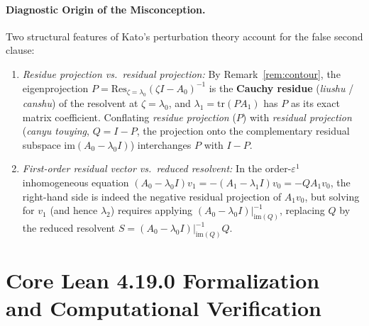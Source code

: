 \documentclass[11pt,a4paper]{article}
\theoremstyle{definition}
\newcommand{\tr}{\mathrm{tr}}
\newcommand{\im}{\mathrm{im}}
\newcommand{\Res}{\mathrm{Res}}
\begin{document}
\paragraph{Diagnostic Origin of the Misconception.}
Two structural features of Kato's perturbation theory account for the false second
clause:
\begin{enumerate}
  \item \emph{Residue projection vs.\ residual projection:} By Remark~\ref{rem:contour},
  the eigenprojection $P = \Res_{\zeta = \lambda_0}(\zeta I - A_0)^{-1}$ is the
  \textbf{Cauchy residue} (\emph{liushu} / \emph{canshu}) of the resolvent at
  $\zeta = \lambda_0$, and $\lambda_1 = \tr(P A_1)$ has $P$ as its exact matrix
  coefficient. Conflating \emph{residue projection} ($P$) with \emph{residual
  projection} (\emph{canyu touying}, $Q = I - P$, the projection onto the complementary
  residual subspace $\im(A_0 - \lambda_0 I)$) interchanges $P$ with $I - P$.
  \item \emph{First-order residual vector vs.\ reduced resolvent:} In the order-$\varepsilon^1$
  inhomogeneous equation $(A_0 - \lambda_0 I) v_1 = -(A_1 - \lambda_1 I) v_0 =
  - Q A_1 v_0$, the right-hand side is indeed the negative residual projection of
  $A_1 v_0$, but solving for $v_1$ (and hence $\lambda_2$) requires applying
  $(A_0 - \lambda_0 I)|_{\im(Q)}^{-1}$, replacing $Q$ by the reduced resolvent
  $S = (A_0 - \lambda_0 I)|_{\im(Q)}^{-1} Q$.
\end{enumerate}

\section{Core Lean 4.19.0 Formalization and Computational Verification}
\end{document}
